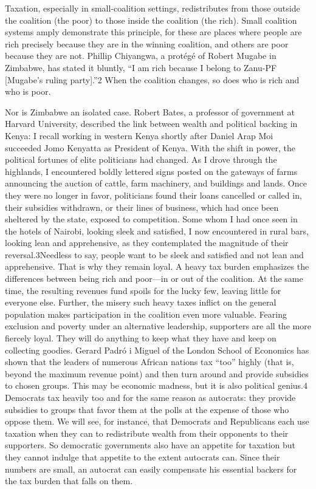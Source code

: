 \documentclass[10pt]{article}
\begin{document}
{\large Taxation, especially in small-coalition settings, redistributes from
those outside the coalition (the poor) to those inside the coalition (the rich).
Small coalition systems amply demonstrate this principle, for these are places
where people are rich precisely because they are in the winning coalition, and
others are poor because they are not. Phillip Chiyangwa, a prot\'{e}g\'{e} of
Robert Mugabe in Zimbabwe, has stated it bluntly, ``I am rich because I belong to
Zanu-PF [Mugabe's ruling party].''2 When the coalition changes, so does who is
rich and who is poor.}

{\large Nor is Zimbabwe an isolated case. Robert Bates, a professor of
government at Harvard University, described the link between wealth and political
backing in Kenya: I recall working in western Kenya shortly after Daniel Arap Moi
succeeded Jomo Kenyatta as President of Kenya. With the shift in power, the
political fortunes of elite politicians had changed. As I drove through the
highlands, I encountered boldly lettered signs posted on the gateways of farms
announcing the auction of cattle, farm machinery, and buildings and lands. Once
they were no longer in favor, politicians found their loans cancelled or called
in, their subsidies withdrawn, or their lines of business, which had once been
sheltered by the state, exposed to competition. Some whom I had once seen in the
hotels of Nairobi, looking sleek and satisfied, I now encountered in rural bars,
looking lean and apprehensive, as they contemplated the magnitude of their
reversal.3Needless to say, people want to be sleek and satisfied and not lean and
apprehensive. That is why they remain loyal. A heavy tax burden emphasizes the
differences between being rich and poor---in or out of the coalition. At the same
time, the resulting revenues fund spoils for the lucky few, leaving little for
everyone else. Further, the misery such heavy taxes inflict on the general
population makes participation in the coalition even more valuable. Fearing
exclusion and poverty under an alternative leadership, supporters are all the
more fiercely loyal. They will do anything to keep what they have and keep on
collecting goodies. Gerard Padr\'{o} i Miguel of the London School of Economics
has shown that the leaders of numerous African nations tax ``too'' highly (that
is, beyond the maximum revenue point) and then turn around and provide subsidies
to chosen groups. This may be economic madness, but it is also political genius.4
Democrats tax heavily too and for the same reason as autocrats: they provide
subsidies to groups that favor them at the polls at the expense of those who
oppose them. We will see, for instance, that Democrats and Republicans each use
taxation when they can to redistribute wealth from their opponents to their
supporters. So democratic governments also have an appetite for taxation but they
cannot indulge that appetite to the extent autocrats can. Since their numbers are
small, an autocrat can easily compensate his essential backers for the tax burden
that falls on them.}
\end{document}
